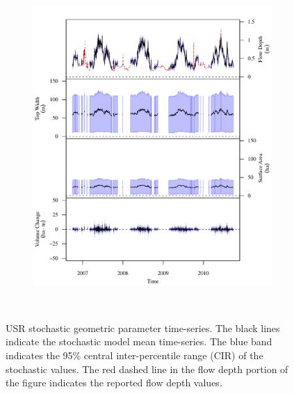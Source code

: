 \begin{linenumbers}
\begin{landscape}
\begin{figure}
\begin{subfigure}{0.7\textwidth}
			\includegraphics[width=\textwidth]{"Figures/Results_USR/Stochastic/G TS B"}
			\label{sub:GeoTS_B}
		\end{subfigure}\\
	\caption[USR stochastic geometric parameter time-series.]{USR stochastic geometric parameter time-series. The black lines indicate the stochastic model mean time-series.  The blue band indicates the 95\% central inter-percentile range (CIR) of the stochastic values.  The red dashed line in the flow depth portion of the figure indicates the reported flow depth values.}
	\label{fig:GeoTS_US}
	\end{figure}
\end{landscape}


\end{linenumbers}

